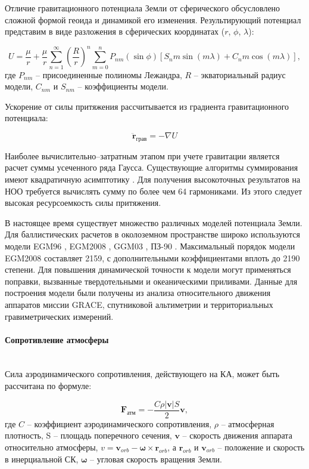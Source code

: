 Отличие гравитационного потенциала Земли от сферического обсусловлено 
сложной формой геоида и динамикой его изменения. Результирующий потенциал представим в виде разложения
в сферических координатах ($r$, $\phi$, $\lambda$):

\begin{equation*}
    U = \frac{\mu}{r} + 
    \frac{\mu}{r} \sum_{n=1}^{\infty} \left(\frac{R}{r}\right)^n 
    \sum_{m=0}^{n} P_{nm}(\sin\phi) \left[ S_nm \sin(m \lambda) + C_nm \cos(m \lambda) \right],
\end{equation*}
где $P_{nm}$ -- присоединенные полиномы Лежандра, $R$ -- экваториальный радиус модели, 
$C_{nm}$ и $S_{nm}$ -- коэффициенты модели.

Ускорение от силы притяжения рассчитывается из градиента гравитационного потенциала:

\begin{equation*}
    \ddot{\mathbf{r}}_{\text{грав}} = -\nabla U
\end{equation*}

Наиболее вычислительно--затратным этапом при учете гравитации является расчет суммы
усеченного ряда Гаусса. Существующие алгоритмы суммирования имеют квадратичную асимптотику
\cite{Clenshaw1955}.
Для получения высокоточных результатов на НОО требуется вычислять сумму по более чем 64 гармониками.
Из этого следует высокая ресурсоемкость силы притяжения.

В настоящее время существует множество различных моделей потенциала Земли.
Для баллистических расчетов в околоземном пространстве широко используются модели EGM96
\cite{Lemoine1998}, EGM2008 \cite{pavlis2012},
GGM03 \cite{Tapley2007}, ПЗ-90 \cite{Galazin1998}.
Максимальный порядок модели EGM2008 составляет 2159, с дополнительными коэффициентами вплоть до 2190 степени.
Для повышения динамической точности к модели могут применяться поправки, вызванные
твердотельными и океаническими приливами. Данные для построения модели были получены из
анализа относительного движения аппаратов миссии GRACE, спутниковой альтиметрии и 
территориальных гравиметрических измерений. 

\paragraph{Сопротивление атмосферы} \mbox{} \\

Сила аэродинамического сопротивления, действующего на КА, может быть рассчитана по формуле:

\begin{equation*}
    \mathbf{F}_{\text{атм}} = - \frac{C \rho |\mathbf{v}| S}{2} \mathbf{v},
\end{equation*}
где $C$ -- коэффициент аэродинамического сопротивления, $\rho$ -- атмосферная плотность, 
S -- площадь поперечного сечения, 
$\mathbf{v}$ -- скорость движения аппарата относительно атмосферы, 
$v = \mathbf{v}_{orb} - \mathbf{\omega} \times \mathbf{r}_{orb}$, а
$\mathbf{r}_{orb}$ и $\mathbf{v}_{orb}$  -- положение и скорость в инерциальной СК,
$\mathbf{\omega}$ -- угловая скорость вращения Земли.

